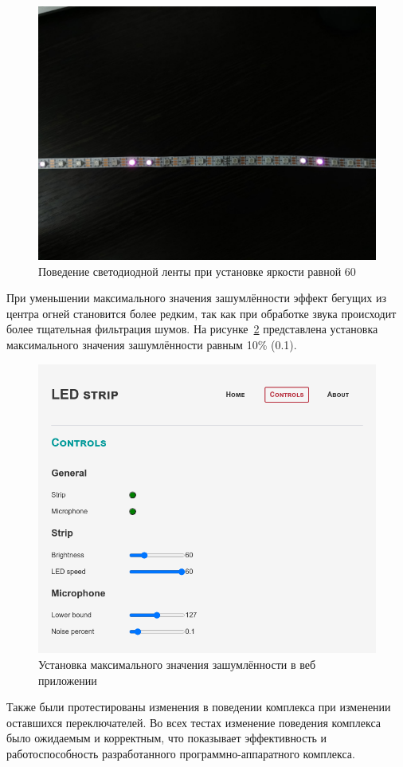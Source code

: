 \begin{figure}[H]
  \centering
  \includegraphics[height=0.25\textheight]{assets/images/practical/test__state2.jpg}
  \caption{Поведение светодиодной ленты при установке яркости равной 60}
  \label{img:test__state2}
\end{figure}

При уменьшении максимального значения зашумлённости эффект бегущих из центра огней становится более редким, так как при обработке звука происходит более тщательная фильтрация шумов. На рисунке~\ref{img:test__controls-noise-01} представлена установка максимального значения зашумлённости равным 10\% (0.1).

\begin{figure}[H]
  \centering
  \includegraphics[height=0.3\textheight]{assets/images/practical/test__controls-noise-01.png}
  \caption{Установка максимального значения зашумлённости в веб приложении}
  \label{img:test__controls-noise-01}
\end{figure}

Также были протестированы изменения в поведении комплекса при изменении оставшихся переключателей. Во всех тестах изменение поведения комплекса было ожидаемым и корректным, что показывает эффективность и работоспособность разработанного программно-аппаратного комплекса.
